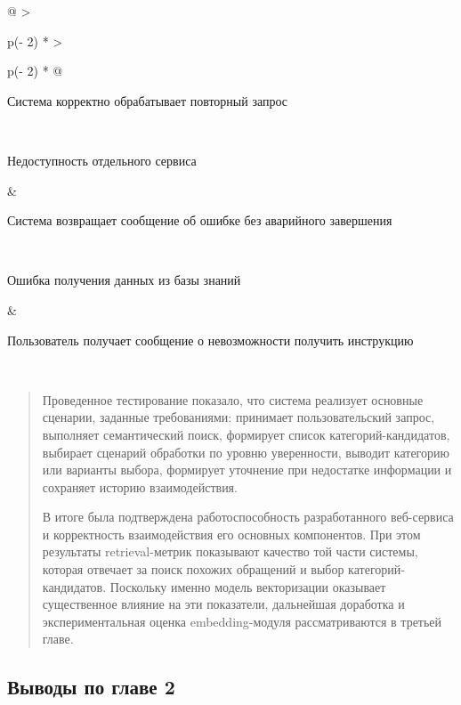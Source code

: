 \begin{longtable}[]{@{}
  >{\raggedright\arraybackslash}p{(\columnwidth - 2\tabcolsep) * }
  >{\raggedright\arraybackslash}p{(\columnwidth - 2\tabcolsep) * }@{}}
\begin{minipage}[b]{\linewidth}
Система корректно обрабатывает повторный запрос
\end{minipage} \\
\begin{minipage}[b]{\linewidth}\raggedright
Недоступность отдельного сервиса
\end{minipage} & \begin{minipage}[b]{\linewidth}\raggedright
Система возвращает сообщение об ошибке без аварийного завершения
\end{minipage} \\
\begin{minipage}[b]{\linewidth}\raggedright
Ошибка получения данных из базы знаний
\end{minipage} & \begin{minipage}[b]{\linewidth}\raggedright
Пользователь получает сообщение о невозможности получить инструкцию
\end{minipage} \\
\midrule\noalign{}
\endhead
\bottomrule\noalign{}
\endlastfoot
\end{longtable}

\begin{quote}
Проведенное тестирование показало, что система реализует основные
сценарии, заданные требованиями: принимает пользовательский запрос,
выполняет семантический поиск, формирует список категорий-кандидатов,
выбирает сценарий обработки по уровню уверенности, выводит категорию или
варианты выбора, формирует уточнение при недостатке информации и
сохраняет историю взаимодействия.

В итоге была подтверждена работоспособность разработанного веб-сервиса и
корректность взаимодействия его основных компонентов. При этом
результаты retrieval-метрик показывают качество той части системы,
которая отвечает за поиск похожих обращений и выбор
категорий-кандидатов. Поскольку именно модель векторизации оказывает
существенное влияние на эти показатели, дальнейшая доработка и
экспериментальная оценка embedding-модуля рассматриваются в третьей
главе.
\end{quote}

\hypertarget{ux432ux44bux432ux43eux434ux44b-ux43fux43e-ux433ux43bux430ux432ux435-2}{%
\subsection{\texorpdfstring{Выводы по главе 2
}{Выводы по главе 2 }}\label{ux432ux44bux432ux43eux434ux44b-ux43fux43e-ux433ux43bux430ux432ux435-2}}

